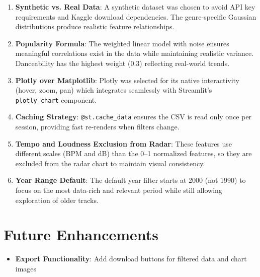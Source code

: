 \documentclass[12pt,a4paper]{article}
\begin{document}
\begin{enumerate}[noitemsep]
    \item \textbf{Synthetic vs. Real Data}: A synthetic dataset was chosen to avoid API key requirements and Kaggle download dependencies. The genre-specific Gaussian distributions produce realistic feature relationships.

    \item \textbf{Popularity Formula}: The weighted linear model with noise ensures meaningful correlations exist in the data while maintaining realistic variance. Danceability has the highest weight (0.3) reflecting real-world trends.

    \item \textbf{Plotly over Matplotlib}: Plotly was selected for its native interactivity (hover, zoom, pan) which integrates seamlessly with Streamlit's \texttt{plotly\_chart} component.

    \item \textbf{Caching Strategy}: \texttt{@st.cache\_data} ensures the CSV is read only once per session, providing fast re-renders when filters change.

    \item \textbf{Tempo and Loudness Exclusion from Radar}: These features use different scales (BPM and dB) than the 0--1 normalized features, so they are excluded from the radar chart to maintain visual consistency.

    \item \textbf{Year Range Default}: The default year filter starts at 2000 (not 1990) to focus on the most data-rich and relevant period while still allowing exploration of older tracks.
\end{enumerate}

\section{Future Enhancements}

\begin{itemize}[noitemsep]
    \item \textbf{Export Functionality}: Add download buttons for filtered data and chart images
\end{itemize}
\end{document}
